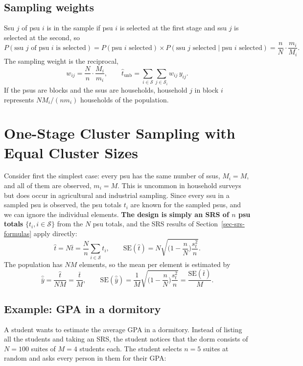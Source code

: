 \documentclass[
  letterpaper,
  DIV=11,
  numbers=noendperiod]{scrreprt}
\renewcommand{\[}{\begin{equation}}
\renewcommand{\]}{\end{equation}}
\begin{document}
\subsection{Sampling weights}\label{sampling-weights}

Ssu \(j\) of psu \(i\) is in the sample if psu \(i\) is selected at the
first stage and ssu \(j\) is selected at the second, so \[
P(\text{ssu } j \text{ of psu } i \text{ is selected})
 = P(\text{psu } i \text{ selected}) \times P(\text{ssu } j \text{ selected} \mid \text{psu } i \text{ selected})
 = \frac nN \cdot \frac{m_i}{M_i}.
\] The sampling weight is the reciprocal, \[
w_{ij} = \frac{N}{n}\cdot\frac{M_i}{m_i}, \qquad
\hat t_{\text{unb}} = \sum_{i\in\mathcal S}\sum_{j\in\mathcal S_i} w_{ij}\,y_{ij} .
\] If the psus are blocks and the ssus are households, household \(j\)
in block \(i\) represents \(NM_i/(nm_i)\) households of the population.

\section{One-Stage Cluster Sampling with Equal Cluster
Sizes}\label{sec-cluster-equal}

Consider first the simplest case: every psu has the same number of ssus,
\(M_i = M\), and all of them are observed, \(m_i = M\). This is uncommon
in household surveys but does occur in agricultural and industrial
sampling. Since every ssu in a sampled psu is observed, the psu totals
\(t_i\) are known for the sampled psus, and we can ignore the individual
elements. \textbf{The design is simply an SRS of \(n\) psu totals}
\(\{t_i, i\in\mathcal S\}\) from the \(N\) psu totals, and the SRS
results of Section~\ref{sec-srs-formulas} apply directly: \[
\hat t = N\bar t = \frac Nn\sum_{i\in\mathcal S} t_i, \qquad
\mathrm{SE}(\hat t) = N\sqrt{\Big(1-\frac nN\Big)\frac{s_t^2}{n}} .
\] The population has \(NM\) elements, so the mean per element is
estimated by \[
\hat{\bar y} = \frac{\hat t}{NM} = \frac{\bar t}{M}, \qquad
\mathrm{SE}(\hat{\bar y}) = \frac{1}{M}\sqrt{\Big(1-\frac nN\Big)\frac{s_t^2}{n}} = \frac{\mathrm{SE}(\bar t)}{M} .
\]

\subsection{Example: GPA in a
dormitory}\label{example-gpa-in-a-dormitory}

A student wants to estimate the average GPA in a dormitory. Instead of
listing all the students and taking an SRS, the student notices that the
dorm consists of \(N = 100\) suites of \(M = 4\) students each. The
student selects \(n = 5\) suites at random and asks every person in them
for their GPA:
\end{document}
